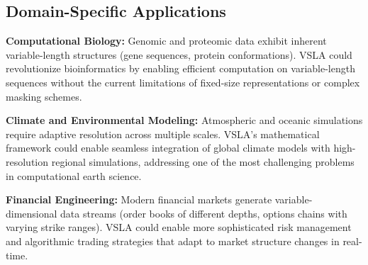 \subsection{Domain-Specific Applications}

\textbf{Computational Biology:} Genomic and proteomic data exhibit inherent variable-length structures (gene sequences, protein conformations). VSLA could revolutionize bioinformatics by enabling efficient computation on variable-length sequences without the current limitations of fixed-size representations or complex masking schemes.

\textbf{Climate and Environmental Modeling:} Atmospheric and oceanic simulations require adaptive resolution across multiple scales. VSLA's mathematical framework could enable seamless integration of global climate models with high-resolution regional simulations, addressing one of the most challenging problems in computational earth science.

\textbf{Financial Engineering:} Modern financial markets generate variable-dimensional data streams (order books of different depths, options chains with varying strike ranges). VSLA could enable more sophisticated risk management and algorithmic trading strategies that adapt to market structure changes in real-time.
